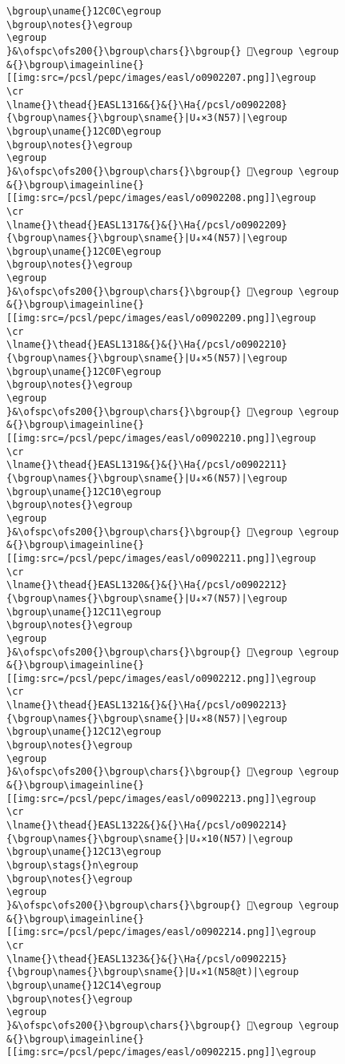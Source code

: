 \begin{verbatim}
\bgroup\uname{}12C0C\egroup
\bgroup\notes{}\egroup
\egroup
}&\ofspc\ofs200{}\bgroup\chars{}\bgroup{} 𒰌\egroup \egroup
&{}\bgroup\imageinline{}[[img:src=/pcsl/pepc/images/easl/o0902207.png]]\egroup
\cr
\lname{}\thead{}EASL1316&{}&{}\Ha{/pcsl/o0902208}{\bgroup\names{}\bgroup\sname{}|U₄×3(N57)|\egroup
\bgroup\uname{}12C0D\egroup
\bgroup\notes{}\egroup
\egroup
}&\ofspc\ofs200{}\bgroup\chars{}\bgroup{} 𒰍\egroup \egroup
&{}\bgroup\imageinline{}[[img:src=/pcsl/pepc/images/easl/o0902208.png]]\egroup
\cr
\lname{}\thead{}EASL1317&{}&{}\Ha{/pcsl/o0902209}{\bgroup\names{}\bgroup\sname{}|U₄×4(N57)|\egroup
\bgroup\uname{}12C0E\egroup
\bgroup\notes{}\egroup
\egroup
}&\ofspc\ofs200{}\bgroup\chars{}\bgroup{} 𒰎\egroup \egroup
&{}\bgroup\imageinline{}[[img:src=/pcsl/pepc/images/easl/o0902209.png]]\egroup
\cr
\lname{}\thead{}EASL1318&{}&{}\Ha{/pcsl/o0902210}{\bgroup\names{}\bgroup\sname{}|U₄×5(N57)|\egroup
\bgroup\uname{}12C0F\egroup
\bgroup\notes{}\egroup
\egroup
}&\ofspc\ofs200{}\bgroup\chars{}\bgroup{} 𒰏\egroup \egroup
&{}\bgroup\imageinline{}[[img:src=/pcsl/pepc/images/easl/o0902210.png]]\egroup
\cr
\lname{}\thead{}EASL1319&{}&{}\Ha{/pcsl/o0902211}{\bgroup\names{}\bgroup\sname{}|U₄×6(N57)|\egroup
\bgroup\uname{}12C10\egroup
\bgroup\notes{}\egroup
\egroup
}&\ofspc\ofs200{}\bgroup\chars{}\bgroup{} 𒰐\egroup \egroup
&{}\bgroup\imageinline{}[[img:src=/pcsl/pepc/images/easl/o0902211.png]]\egroup
\cr
\lname{}\thead{}EASL1320&{}&{}\Ha{/pcsl/o0902212}{\bgroup\names{}\bgroup\sname{}|U₄×7(N57)|\egroup
\bgroup\uname{}12C11\egroup
\bgroup\notes{}\egroup
\egroup
}&\ofspc\ofs200{}\bgroup\chars{}\bgroup{} 𒰑\egroup \egroup
&{}\bgroup\imageinline{}[[img:src=/pcsl/pepc/images/easl/o0902212.png]]\egroup
\cr
\lname{}\thead{}EASL1321&{}&{}\Ha{/pcsl/o0902213}{\bgroup\names{}\bgroup\sname{}|U₄×8(N57)|\egroup
\bgroup\uname{}12C12\egroup
\bgroup\notes{}\egroup
\egroup
}&\ofspc\ofs200{}\bgroup\chars{}\bgroup{} 𒰒\egroup \egroup
&{}\bgroup\imageinline{}[[img:src=/pcsl/pepc/images/easl/o0902213.png]]\egroup
\cr
\lname{}\thead{}EASL1322&{}&{}\Ha{/pcsl/o0902214}{\bgroup\names{}\bgroup\sname{}|U₄×10(N57)|\egroup
\bgroup\uname{}12C13\egroup
\bgroup\stags{}n\egroup
\bgroup\notes{}\egroup
\egroup
}&\ofspc\ofs200{}\bgroup\chars{}\bgroup{} 𒰓\egroup \egroup
&{}\bgroup\imageinline{}[[img:src=/pcsl/pepc/images/easl/o0902214.png]]\egroup
\cr
\lname{}\thead{}EASL1323&{}&{}\Ha{/pcsl/o0902215}{\bgroup\names{}\bgroup\sname{}|U₄×1(N58@t)|\egroup
\bgroup\uname{}12C14\egroup
\bgroup\notes{}\egroup
\egroup
}&\ofspc\ofs200{}\bgroup\chars{}\bgroup{} 𒰔\egroup \egroup
&{}\bgroup\imageinline{}[[img:src=/pcsl/pepc/images/easl/o0902215.png]]\egroup

\end{verbatim}

